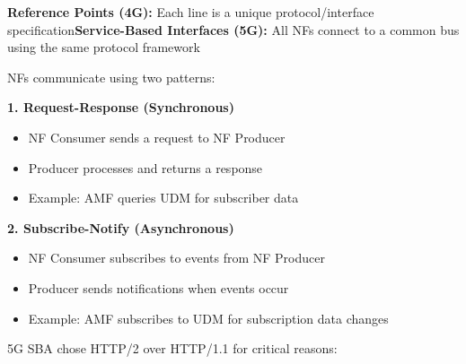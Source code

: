 


\CNchained{}


\textbf{Reference Points (4G):} Each line is a unique protocol/\allowbreak{}interface specification\CNbr{}\textbf{Service-Based Interfaces (5G):} All NFs connect to a common bus using the same protocol framework


NFs communicate using two patterns:

\textbf{1. Request-Response (Synchronous)}

\begin{itemize}
\tightlist
\item
  NF Consumer sends a request to NF Producer
\item
  Producer processes and returns a response
\item
  Example: AMF queries UDM for subscriber data
\end{itemize}

\textbf{2. Subscribe-Notify (Asynchronous)}

\begin{itemize}
\tightlist
\item
  NF Consumer subscribes to events from NF Producer
\item
  Producer sends notifications when events occur
\item
  Example: AMF subscribes to UDM for subscription data changes
\end{itemize}



5G SBA chose HTTP/\allowbreak{}2 over HTTP/\allowbreak{}1.1 for critical reasons:

